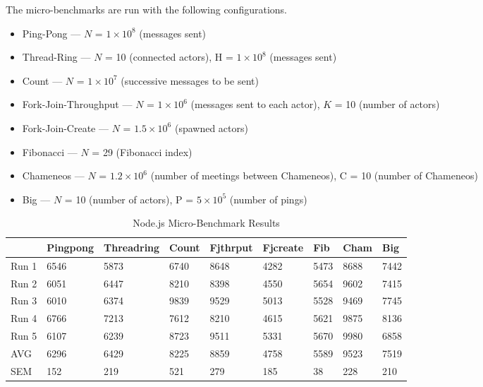 \documentclass[oneside]{um-fict}
\begin{document}
The micro-benchmarks are run with the following configurations.
\begin{itemize}
    \item Ping-Pong --- $N$ = $1\times10^8$ (messages sent)
    \item Thread-Ring --- $N$ = 10 (connected actors), H = $1\times10^8$ (messages sent)
    \item Count --- $N$ = $1\times10^7$ (successive messages to be sent)
    \item Fork-Join-Throughput --- $N$ = $1\times10^6$ (messages sent to each actor), $K$ = 10 (number of actors)
    \item Fork-Join-Create --- $N$ = $1.5\times10^6$ (spawned actors)
    \item Fibonacci --- $N$ = 29 (Fibonacci index)
    \item Chameneos --- $N$ = $1.2\times10^6$ (number of meetings between Chameneos), C = 10 (number of Chameneos)
    \item Big --- $N$ = 10 (number of actors), P = $5\times10^5$ (number of pings) 
\end{itemize}
\begin{table}[H]
    \begin{center}
    \begin{tabular}{|l|llllllll|}
    \hline
          & Pingpong & Threadring & Count  & Fjthrput & Fjcreate & Fib    & Cham & Big    \\ \hline
    Run 1 & 6546     & 5873       & 6740   & 8648     & 4282     & 5473   & 8688      & 7442   \\
    Run 2 & 6051     & 6447       & 8210   & 8398     & 4550     & 5654   & 9602      & 7415   \\
    Run 3 & 6010     & 6374       & 9839   & 9529     & 5013     & 5528   & 9469      & 7745   \\
    Run 4 & 6766     & 7213       & 7612   & 8210     & 4615     & 5621   & 9875      & 8136   \\
    Run 5 & 6107     & 6239       & 8723   & 9511     & 5331     & 5670   & 9980      & 6858   \\ \hline
    AVG   & 6296   & 6429     & 8225 & 8859   & 4758   & 5589 & 9523    & 7519 \\
    SEM   & 152   & 219     & 521 & 279   & 185   & 38  & 228    & 210  \\ \hline
    \end{tabular}
    \caption{Node.js Micro-Benchmark Results}\label{tab:nodemicro}
\end{center}
\end{table}
\end{document}
